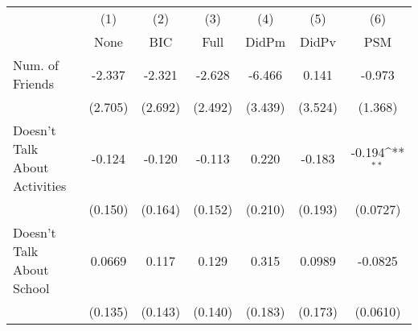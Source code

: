 {
\def\sym#1{\ifmmode^{#1}\else\(^{#1}\)\fi}
\begin{tabular}{l*{6}{c}}
\toprule
            &\multicolumn{1}{c}{(1)}&\multicolumn{1}{c}{(2)}&\multicolumn{1}{c}{(3)}&\multicolumn{1}{c}{(4)}&\multicolumn{1}{c}{(5)}&\multicolumn{1}{c}{(6)}\\
            &\multicolumn{1}{c}{None}&\multicolumn{1}{c}{BIC}&\multicolumn{1}{c}{Full}&\multicolumn{1}{c}{DidPm}&\multicolumn{1}{c}{DidPv}&\multicolumn{1}{c}{PSM}\\
\midrule
Num. of Friends&      -2.337         &      -2.321         &      -2.628         &      -6.466         &       0.141         &      -0.973         \\
            &     (2.705)         &     (2.692)         &     (2.492)         &     (3.439)         &     (3.524)         &     (1.368)         \\
\addlinespace
Doesn't Talk About Activities&      -0.124         &      -0.120         &      -0.113         &       0.220         &      -0.183         &      -0.194\sym{**} \\
            &     (0.150)         &     (0.164)         &     (0.152)         &     (0.210)         &     (0.193)         &    (0.0727)         \\
\addlinespace
Doesn't Talk About School&      0.0669         &       0.117         &       0.129         &       0.315         &      0.0989         &     -0.0825         \\
            &     (0.135)         &     (0.143)         &     (0.140)         &     (0.183)         &     (0.173)         &    (0.0610)         \\
\bottomrule
\end{tabular}
}
